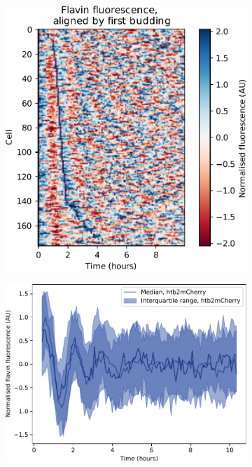 \begin{figure}[p]
  \centering
  \begin{subfigure}[htpb]{0.45\textwidth}
   \centering
   \includegraphics[width=\textwidth]{heatmap_edit.pdf}
   \caption{
   }
   \label{fig:biology-highglc-sync-heatmap}
  \end{subfigure}%
  \begin{subfigure}[htpb]{0.45\textwidth}
   \centering
   \includegraphics[width=\textwidth]{htb2mCherry_highglcreps_6.pdf}
   \caption{
   }
   \label{fig:biology-highglc-sync-median}
  \end{subfigure}


\end{figure}
